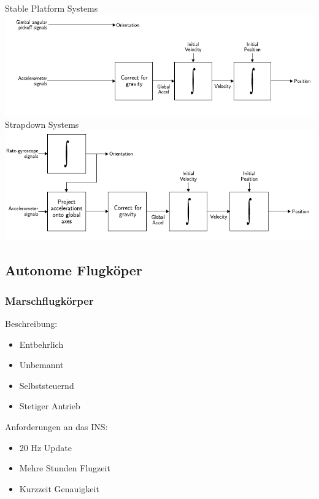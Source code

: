 \documentclass[10pt,a4paper,oneside]{beamer}
\begin{document}
\begin{frame}
	Stable Platform Systems
	\resizebox{\textwidth}{0.4\textheight} {
	\includegraphics[scale=1]{images/stable_platform.png} 
	}
	\bigskip
	Strapdown Systems
	\resizebox{\textwidth}{0.4\textheight} {
		\includegraphics[scale=1]{images/strapdown.png} 
	}

\end{frame}

\begin{frame}
	\section{Autonome Flugköper}
	\frametitle{Marschflugkörper}
	Beschreibung: \cite{GS04}
	
	\begin{itemize}
		\item Entbehrlich
		\item Unbemannt
		\item Selbststeuernd
		\item Stetiger Antrieb
	\end{itemize}
	
	Anforderungen an das INS:\\
	\begin{itemize}
		\item 20 Hz Update
		\item Mehre Stunden Flugzeit
		\item Kurzzeit Genauigkeit
	\end{itemize}
	
\end{frame}
\end{document}
